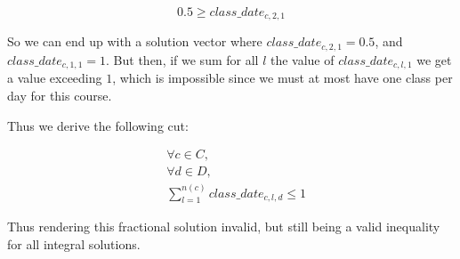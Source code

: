 $$
0.5 \ge class\_date_{c, 2, 1}
$$

So we can end up with a solution vector where $class\_date_{c, 2, 1} = 0.5$, and $class\_date_{c, 1, 1} = 1$. But then, if we sum for all $l$ the value of $class\_date_{c, l, 1}$ we get a value exceeding $1$, which is impossible since we must at most have one class per day for this course.

Thus we derive the following cut:

\begin{align}
&\forall c \in C,\\
&\forall d \in D,\\
&\sum_{l = 1}^{n(c)} class\_date_{c, l, d} \le 1
\end{align}

Thus rendering this fractional solution invalid, but still being a valid inequality for all integral solutions.
